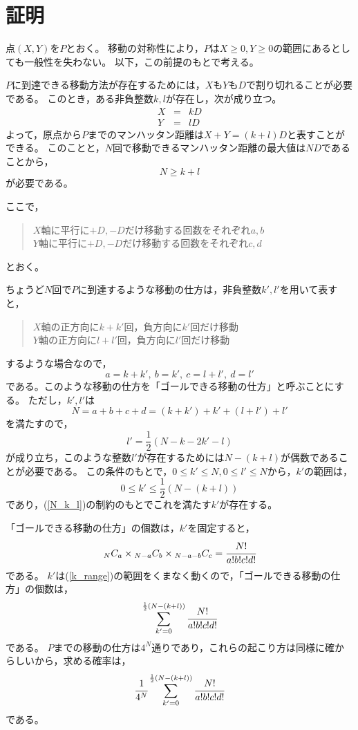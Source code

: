 \documentclass{article}
\begin{document}
\section{証明}

点$(X, Y)$を$P$とおく。
移動の対称性により，$P$は$X \geq 0, Y \geq 0$の範囲にあるとしても一般性を失わない。
以下，この前提のもとで考える。

$P$に到達できる移動方法が存在するためには，$X$も$Y$も$D$で割り切れることが必要である。
このとき，ある非負整数$k, l$が存在し，次が成り立つ。
\begin{eqnarray*}
    X &=& kD \\
    Y &=& lD
\end{eqnarray*}
よって，原点から$P$までのマンハッタン距離は$X + Y = (k + l)D$と表すことができる。
このことと，$N$回で移動できるマンハッタン距離の最大値は$ND$であることから，
\begin{equation}
    \label{N_k_l}
    N \geq k + l
\end{equation}
が必要である。

ここで，
\begin{quote}
    $X$軸に平行に$+D, -D$だけ移動する回数をそれぞれ$a, b$ \\
    $Y$軸に平行に$+D, -D$だけ移動する回数をそれぞれ$c, d$
\end{quote}
とおく。

ちょうど$N$回で$P$に到達するような移動の仕方は，非負整数$k', l'$を用いて表すと，
\begin{quote}
    $X$軸の正方向に$k + k'$回，負方向に$k'$回だけ移動 \\
    $Y$軸の正方向に$l + l'$回，負方向に$l'$回だけ移動
\end{quote}
するような場合なので，
$$a = k + k',\ b = k',\ c = l + l',\ d = l'$$
である。このような移動の仕方を「ゴールできる移動の仕方」と呼ぶことにする。
ただし，$k', l'$は
$$N = a + b + c + d = (k + k') + k' + (l + l') + l'$$
を満たすので，
$$l' = \frac{1}{2} (N - k - 2k' - l)$$
が成り立ち，このような整数$l'$が存在するためには$N-(k+l)$が偶数であることが必要である。
この条件のもとで，$0 \leq k' \leq N, 0 \leq l' \leq N$から，$k'$の範囲は，
\begin{equation}
    \label{k_range}
    0 \leq k' \leq \frac{1}{2} (N - (k + l))
\end{equation}
であり，(\ref{N_k_l})の制約のもとでこれを満たす$k'$が存在する。

「ゴールできる移動の仕方」の個数は，$k'$を固定すると，
\[
    {}_N C_a \times {}_{N-a} C_b \times {}_{N-a-b} C_c = \cfrac{N!}{a!b!c!d!}
\]
である。
$k'$は(\ref{k_range})の範囲をくまなく動くので，「ゴールできる移動の仕方」の個数は，
\[
    \sum_{k' = 0}^{ \frac{1}{2} (N - (k + l)) } \cfrac{N!}{a!b!c!d!}
\]
である。
$P$までの移動の仕方は$4^N$通りであり，これらの起こり方は同様に確からしいから，求める確率は，
\begin{equation}
    \label{answer}
    \cfrac{1}{4^N} \sum_{k' = 0}^{ \frac{1}{2} (N - (k + l)) } \cfrac{N!}{a!b!c!d!}
\end{equation}
である。
\end{document}
